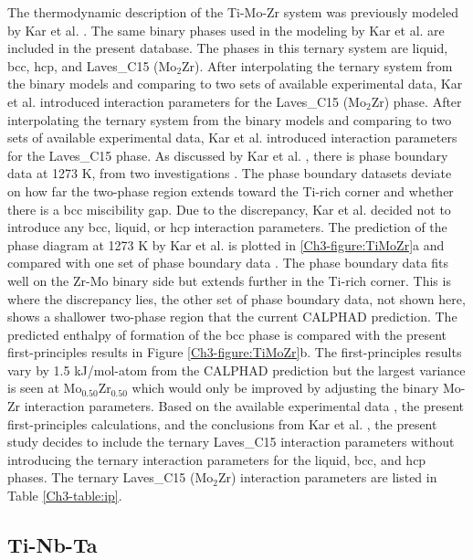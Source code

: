 The thermodynamic description of the Ti-Mo-Zr system was previously modeled by Kar et al. \cite{Kar2008}. The same binary phases used in the modeling by Kar et al. are included in the present database. The phases in this ternary system are liquid, bcc, hcp, and Laves\_C15 (Mo$_{2}$Zr). After interpolating the ternary system from the binary models and comparing to two sets of available experimental data, Kar et al. \cite{Kar2008} introduced interaction parameters for the Laves\_C15 (Mo$_{2}$Zr) phase. After interpolating the ternary system from the binary models and comparing to two sets of available experimental data, Kar et al. \cite{Kar2008} introduced interaction parameters for the Laves\_C15 phase. As discussed by Kar et al. \cite{Kar2008}, there is phase boundary data at 1273 K, from two investigations \cite{Kar2008}. The phase boundary datasets deviate on how far the two-phase region extends toward the Ti-rich corner and whether there is a bcc miscibility gap. Due to the discrepancy, Kar et al. \cite{Kar2008} decided not to introduce any bcc, liquid, or hcp interaction parameters. The prediction of the phase diagram at 1273 K by Kar et al. \cite{Kar2008} is plotted in \ref{Ch3-figure:TiMoZr}a and compared with one set of phase boundary data \cite{Kar2008}. The phase boundary data fits well on the Zr-Mo binary side but extends further in the Ti-rich corner. This is where the discrepancy lies, the other set of phase boundary data, not shown here, shows a shallower two-phase region that the current CALPHAD prediction. The predicted enthalpy of formation of the bcc phase is compared with the present first-principles results in Figure \ref{Ch3-figure:TiMoZr}b. The first-principles results vary by 1.5 kJ/mol-atom from the CALPHAD prediction but the largest variance is seen at Mo$_{0.50}$Zr$_{0.50}$ which would only be improved by adjusting the binary Mo-Zr interaction parameters. Based on the available experimental data \cite{Kar2008}, the present first-principles calculations, and the conclusions from Kar et al. \cite{Kar2008}, the present study decides to include the ternary Laves\_C15 interaction parameters without introducing the ternary interaction parameters for the liquid, bcc, and hcp phases. The ternary Laves\_C15 (Mo$_{2}$Zr) interaction parameters are listed in Table \ref{Ch3-table:ip}.

\subsection{Ti-Nb-Ta}

